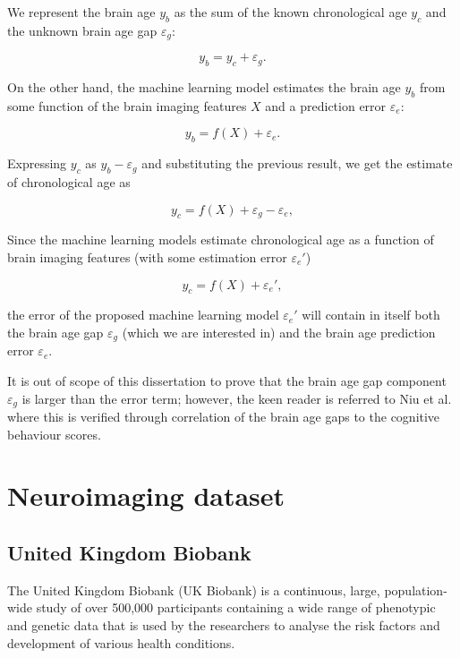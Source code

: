 We represent the brain age $y_b$ as the sum of the known chronological age $y_c$ and the unknown brain age gap $\varepsilon_g$:

\begin{equation}
    y_b = y_c + \varepsilon_g.
\end{equation}

On the other hand, the machine learning model estimates the brain age $y_b$ from some function of the brain imaging features $X$ and a prediction error $\varepsilon_e$:

\begin{equation}
    y_b = f(X) + \varepsilon_e.    
\end{equation}

Expressing $y_c$ as $y_b - \varepsilon_g$ and substituting the previous result, we get the estimate of chronological age as

\begin{equation}
    y_c = f(X) + \varepsilon_g - \varepsilon_e,
\end{equation}

Since the machine learning models estimate chronological age as a function of brain imaging features (with some estimation error $\varepsilon_e'$)

\begin{equation}
    y_c = f(X) + \varepsilon_e',
\end{equation}

the error of the proposed machine learning model $\varepsilon_e'$ will contain in itself both the brain age gap $\varepsilon_g$ (which we are interested in) and the brain age prediction error $\varepsilon_e$.

It is out of scope of this dissertation to prove that the brain age gap component $\varepsilon_g$ is larger than the error term; however, the keen reader is referred to Niu et al. \cite{niu2019improved} where this is verified through correlation of the brain age gaps to the cognitive behaviour scores.

\section{Neuroimaging dataset}

\subsection{United Kingdom Biobank}

The United Kingdom Biobank (UK Biobank) \cite{sudlow2015uk} is a continuous, large, population-wide study of over 500,000 participants containing a wide range of phenotypic and genetic data that is used by the researchers to analyse the risk factors and development of various health conditions. 

